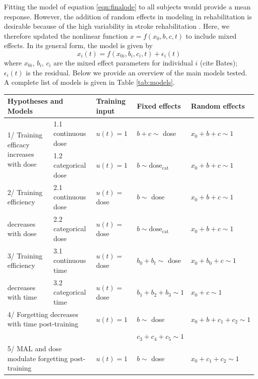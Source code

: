 Fitting the model of equation \ref{eqn:finalode} to all subjects would provide a mean response. 
However, the addition of random effects in modeling in rehabilitation is desirable because of the high variability in stroke rehabilitation \cite{Park2017}.
Here, we therefore updated the nonlinear function $ x=f(x_0,b,c,t) $ to include mixed effects. 
In its general form, the model is given by
\begin{equation}
	x_i(t) = f(x_{0i},b_i,c_i,t) + \epsilon_i (t)
\end{equation}
where $ x_{0i} $, $ b_i $, $ c_i $ are the mixed effect parameters for individual $ i $ (cite Bates); $ \epsilon_i (t) $ is the residual. 
Below we provide an overview of the main models tested. 
A complete list of models is given in Table \ref{tab:models}.

\begin{table}[b]
	\footnotesize
	\begin{tabular}{|l|l|l|l|l|}
		\hline
		\multicolumn{2}{|l|}{Hypotheses and Models} & Training input & Fixed effects & Random effects \\
		\hline
		\multirow{2}{3cm}{1/ Training efficacy increases with dose}  & 1.1 continuous dose & $ u(t) = 1 $ & $ b + c \sim $ dose & $ x_0 + b + c \sim 1 $ \\
		\cline{2-5}
		& 1.2 categorical dose & $ u(t) = 1 $ & $ b \sim \text{dose}_\text{cat} $ & $ x_0 + b + c \sim 1 $ \\
		\hline
		2/ Training efficiency & 2.1 continuous dose & $ u(t) = $ dose & $ b \sim $ dose & $ x_0 + b + c \sim 1 $ \\ \cline{2-5}		
		decreases with dose & 2.2 categorical dose & $ u(t) = $ dose & $ b \sim \text{dose}_\text{cat} $ & $ x_0 + b + c \sim 1 $ \\
		\hline
		3/ Training efficiency & 3.1 continuous time & $ u(t) = $ dose & $ b_0 + b_t \sim $ dose & $ x_0 + b_0 + c \sim 1 $ \\ \cline{2-5}
		decreases with time & 3.2 categorical time & $ u(t) = $ dose & $ b_1 + b_2 + b_3 \sim 1 $ & $ x_0 + c \sim 1 $ \\
		\hline
		\multicolumn{2}{|l|}{4/ Forgetting decreases with time post-training} & $ u(t)=1 $ & $ b \sim $ dose & $ x_0+b+c_1+c_2 \sim 1 $\\		
		\multicolumn{2}{|l|}{} && $ c_3 + c_4 + c_5 \sim 1 $ & \\ 		
		\hline
		\multicolumn{2}{|l|}{5/ MAL and dose modulate forgetting post-training} & $ u(t)=1 $ & $ b \sim $ dose & $ x_0 + c_1 + c_2 \sim 1 $\\	

\end{tabular}
\end{table}
